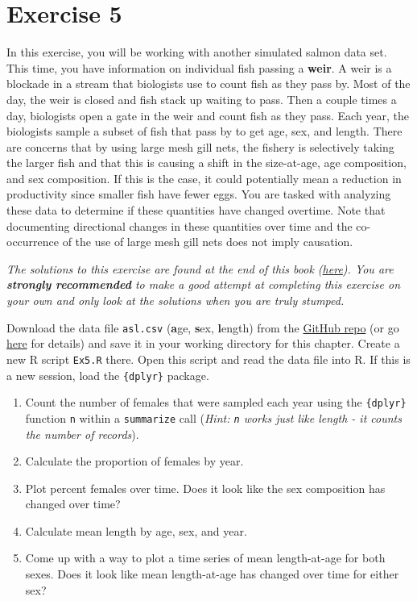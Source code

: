 \documentclass[]{book}
\theoremstyle{definition}
\theoremstyle{definition}
\theoremstyle{definition}
\theoremstyle{remark}
\begin{document}
\section*{Exercise 5}\label{exercise-5}

In this exercise, you will be working with another simulated salmon data
set. This time, you have information on individual fish passing a
\textbf{weir}. A weir is a blockade in a stream that biologists use to
count fish as they pass by. Most of the day, the weir is closed and fish
stack up waiting to pass. Then a couple times a day, biologists open a
gate in the weir and count fish as they pass. Each year, the biologists
sample a subset of fish that pass by to get age, sex, and length. There
are concerns that by using large mesh gill nets, the fishery is
selectively taking the larger fish and that this is causing a shift in
the size-at-age, age composition, and sex composition. If this is the
case, it could potentially mean a reduction in productivity since
smaller fish have fewer eggs. You are tasked with analyzing these data
to determine if these quantities have changed overtime. Note that
documenting directional changes in these quantities over time and the
co-occurrence of the use of large mesh gill nets does not imply
causation.

\emph{The solutions to this exercise are found at the end of this book
(\protect\hyperlink{ex5-answers}{here}). You are \textbf{strongly
recommended} to make a good attempt at completing this exercise on your
own and only look at the solutions when you are truly stumped.}

Download the data file \texttt{asl.csv} (\textbf{a}ge, \textbf{s}ex,
\textbf{l}ength) from the
\href{https://github.com/bstaton1/au-r-workshop-data}{GitHub repo} (or
go \protect\hyperlink{data-sets}{here} for details) and save it in your
working directory for this chapter. Create a new R script \texttt{Ex5.R}
there. Open this script and read the data file into R. If this is a new
session, load the \texttt{\{dplyr\}} package.

\begin{enumerate}
\def\labelenumi{\arabic{enumi}.}
\item
  Count the number of females that were sampled each year using the
  \texttt{\{dplyr\}} function \texttt{n} within a \texttt{summarize}
  call (\emph{Hint: \texttt{n} works just like length - it counts the
  number of records}).
\item
  Calculate the proportion of females by year.
\item
  Plot percent females over time. Does it look like the sex composition
  has changed over time?
\item
  Calculate mean length by age, sex, and year.
\item
  Come up with a way to plot a time series of mean length-at-age for
  both sexes. Does it look like mean length-at-age has changed over time
  for either sex?
\end{enumerate}
\end{document}
